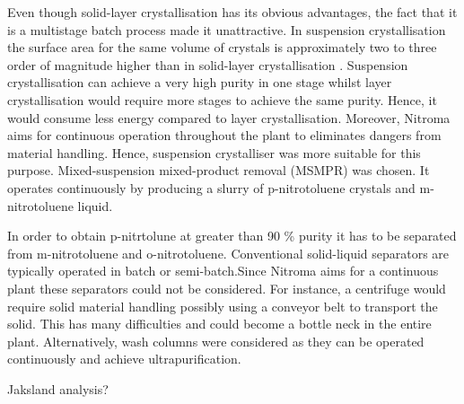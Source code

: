 Even though solid-layer crystallisation has its obvious advantages, the fact that it is a multistage batch process made it unattractive. In suspension crystallisation the surface area for the same volume of crystals is approximately two to three order of magnitude higher than in solid-layer crystallisation \cite{noauthor_types_nodate}. Suspension crystallisation can achieve a very high purity in one stage whilst layer crystallisation would require more stages to achieve the same purity. Hence, it would consume less energy compared to layer crystallisation. Moreover, Nitroma aims for continuous operation throughout the plant to eliminates dangers from material handling. Hence, suspension crystalliser was more suitable for this purpose. Mixed-suspension mixed-product removal (MSMPR) was chosen. It operates continuously by producing a slurry of p-nitrotoluene crystals and m-nitrotoluene liquid.

In order to obtain p-nitrtolune at greater than 90 \% purity it has to be separated from m-nitrotoluene and o-nitrotoluene. Conventional solid-liquid separators are  typically operated in batch or semi-batch.Since Nitroma aims for a continuous plant these separators could not be considered. For instance, a centrifuge would require  solid material handling possibly using a conveyor belt to transport the solid. This has many difficulties and could become a bottle neck in the entire plant. Alternatively, wash columns were considered as they can be operated continuously and achieve ultrapurification. 

Jaksland analysis?

